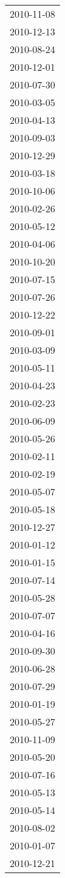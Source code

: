 \begin{tabular}{l}
2010-11-08 \\
2010-12-13 \\
2010-08-24 \\
2010-12-01 \\
2010-07-30 \\
2010-03-05 \\
2010-04-13 \\
2010-09-03 \\
2010-12-29 \\
2010-03-18 \\
2010-10-06 \\
2010-02-26 \\
2010-05-12 \\
2010-04-06 \\
2010-10-20 \\
2010-07-15 \\
2010-07-26 \\
2010-12-22 \\
2010-09-01 \\
2010-03-09 \\
2010-05-11 \\
2010-04-23 \\
2010-02-23 \\
2010-06-09 \\
2010-05-26 \\
2010-02-11 \\
2010-02-19 \\
2010-05-07 \\
2010-05-18 \\
2010-12-27 \\
2010-01-12 \\
2010-01-15 \\
2010-07-14 \\
2010-05-28 \\
2010-07-07 \\
2010-04-16 \\
2010-09-30 \\
2010-06-28 \\
2010-07-29 \\
2010-01-19 \\
2010-05-27 \\
2010-11-09 \\
2010-05-20 \\
2010-07-16 \\
2010-05-13 \\
2010-05-14 \\
2010-08-02 \\
2010-01-07 \\
2010-12-21 \\

\end{tabular}
